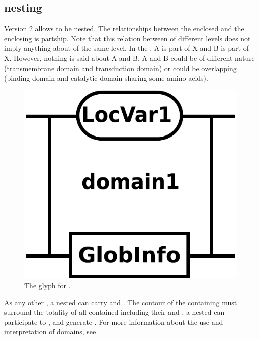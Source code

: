 
\subsection{ nesting }
\label{sec:domain}

\SBGNERLone Version 2 allows  to be nested. The relationships between the enclosed  and the enclosing  is partship. Note that this relation between  of different levels does not imply anything about  of the same level. In the , A is part of X and B is part of X. However, nothing is said about A and B. A and B could be of different nature (transmembrane domain and transduction domain) or could be overlapping (binding domain and catalytic domain sharing some amino-acids). 

\begin{figure}[H]
  \centering
  \includegraphics[scale = 0.3]{images/domain}
  \caption{The \ER glyph for .}
  \label{fig:domain}
\end{figure}

As any other , a nested  can carry  and . The contour of the containing  must surround the totality of all contained  including their  and . a nested  can participate to , and generate . For more information about the use and interpretation of domains, see  

